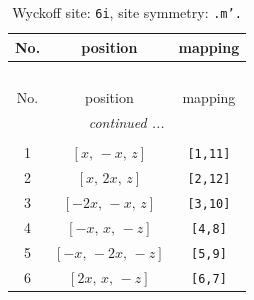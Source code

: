 \documentclass[fleqn,8pt]{jsarticle}
\begin{document}
\renewcommand{\arraystretch}{1.2}
\begin{longtable}{ccc}
\caption{Wyckoff site: {\tt 6i}, site symmetry: {\tt .m'.}}
 \\
 \hline \hline
No. & position & mapping \\ \hline \endfirsthead

\multicolumn{2}{l}{\tablename\ \thetable{}} \\
 \hline \hline
No. & position & mapping \\ \hline \endhead

 \hline \hline
\multicolumn{2}{r}{\footnotesize\it continued ...} \\ \endfoot

 \hline \hline
\multicolumn{2}{r}{} \\ \endlastfoot

1 & $\left[ x,\, - x,\, z \right]$ & {\tt [1,11]} \\ \hline
2 & $\left[ x,\, 2 x,\, z \right]$ & {\tt [2,12]} \\ \hline
3 & $\left[ - 2 x,\, - x,\, z \right]$ & {\tt [3,10]} \\ \hline
4 & $\left[ - x,\, x,\, - z \right]$ & {\tt [4,8]} \\ \hline
5 & $\left[ - x,\, - 2 x,\, - z \right]$ & {\tt [5,9]} \\ \hline
6 & $\left[ 2 x,\, x,\, - z \right]$ & {\tt [6,7]} \\
\end{longtable}
\renewcommand{\arraystretch}{1.2}
\end{document}
